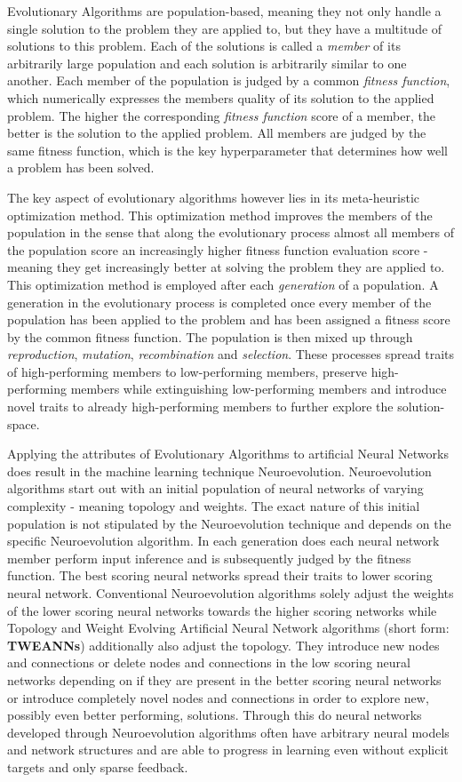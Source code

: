 \documentclass[journal, a4paper]{IEEEtran}
\begin{document}
Evolutionary Algorithms are population-based, meaning they not only handle a single solution to the problem they are applied to, but they have a multitude of solutions to this problem. Each of the solutions is called a \textit{member} of its arbitrarily large population and each solution is arbitrarily similar to one another. Each member of the population is judged by a common \textit{fitness function}, which numerically expresses the members quality of its solution to the applied problem. The higher the corresponding \textit{fitness function} score of a member, the better is the solution to the applied problem. All members are judged by the same fitness function, which is the key hyperparameter that determines how well a problem has been solved.

The key aspect of evolutionary algorithms however lies in its meta-heuristic optimization method. This optimization method improves the members of the population in the sense that along the evolutionary process almost all members of the population score an increasingly higher fitness function evaluation score - meaning they get increasingly better at solving the problem they are applied to.
This optimization method is employed after each \textit{generation} of a population. A generation in the evolutionary process is completed once every member of the population has been applied to the problem and has been assigned a fitness score by the common fitness function. The population is then mixed up through \textit{reproduction}, \textit{mutation}, \textit{recombination} and \textit{selection}. These processes spread traits of high-performing members to low-performing members, preserve high-performing members while extinguishing low-performing members and introduce novel traits to already high-performing members to further explore the solution-space.

Applying the attributes of Evolutionary Algorithms to artificial Neural Networks does result in the machine learning technique Neuroevolution. Neuroevolution algorithms start out with an initial population of neural networks of varying complexity - meaning topology and weights. The exact nature of this initial population is not stipulated by the Neuroevolution technique and depends on the specific Neuroevolution algorithm. In each generation does each neural network member perform input inference and is subsequently judged by the fitness function. The best scoring neural networks spread their traits to lower scoring neural network. Conventional Neuroevolution algorithms solely adjust the weights of the lower scoring neural networks towards the higher scoring networks while Topology and Weight Evolving Artificial Neural Network algorithms (short form: \textbf{TWEANNs}) additionally also adjust the topology. They introduce new nodes and connections or delete nodes and connections in the low scoring neural networks depending on if they are present in the better scoring neural networks or introduce completely novel nodes and connections in order to explore new, possibly even better performing, solutions.
Through this do neural networks developed through Neuroevolution algorithms often have arbitrary neural models and network structures and are able to progress in learning even without explicit targets and only sparse feedback.
\end{document}
